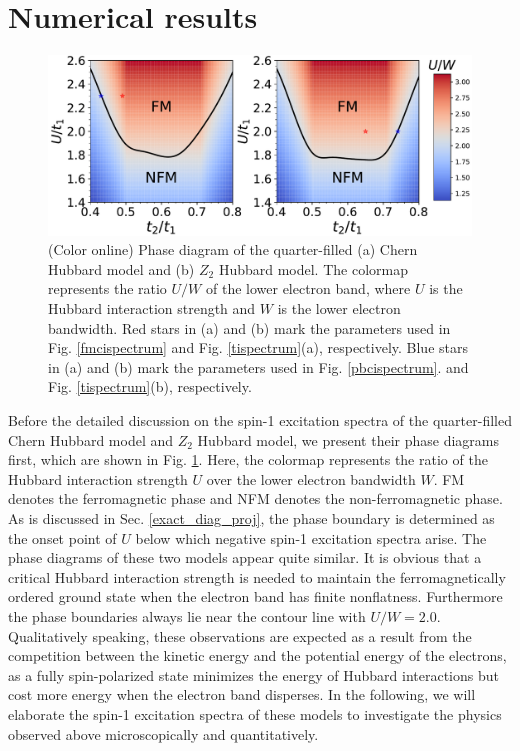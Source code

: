 \documentclass[amsmath,superscriptaddress,showpacs,aps,prb,twocolumn]{revtex4-1}
\begin{document}
\section{Numerical results}\label{nr}
\begin{figure}
\includegraphics[width=\columnwidth]{phase}
\caption{(Color online) Phase diagram of the quarter-filled (a) Chern Hubbard model and (b) $Z_2$ Hubbard model. The colormap represents the ratio $U/W$ of the lower electron band, where $U$ is the Hubbard interaction strength and $W$ is the lower electron bandwidth. Red stars in (a) and (b) mark the parameters used in Fig. \ref{fmcispectrum} and Fig. \ref{tispectrum}(a), respectively. Blue stars in (a) and (b) mark the parameters used in Fig. \ref{pbcispectrum}. and Fig. \ref{tispectrum}(b), respectively.}
\label{phase}
\end{figure}

\par Before the detailed discussion on the spin-1 excitation spectra of the quarter-filled Chern Hubbard model and $Z_2$ Hubbard model, we present their phase diagrams first, which are shown in Fig. \ref{phase}. Here, the colormap represents the ratio of the Hubbard interaction strength $U$ over the lower electron bandwidth $W$. FM denotes the ferromagnetic phase and NFM denotes the non-ferromagnetic phase. As is discussed in Sec. \ref{exact_diag_proj}, the phase boundary is determined as the onset point of $U$ below which negative spin-1 excitation spectra arise. The phase diagrams of these two models appear quite similar. It is obvious that a critical Hubbard interaction strength is needed to maintain the ferromagnetically ordered ground state when the electron band has finite nonflatness. Furthermore the phase boundaries always lie near the contour line with $U/W=2.0$. Qualitatively speaking, these observations are expected as a result from the competition between the kinetic energy and the potential energy of the electrons, as a fully spin-polarized state minimizes the energy of Hubbard interactions but cost more energy when the electron band disperses. In the following, we will elaborate the spin-1 excitation spectra of these models to investigate the physics observed above microscopically and quantitatively.
\end{document}
